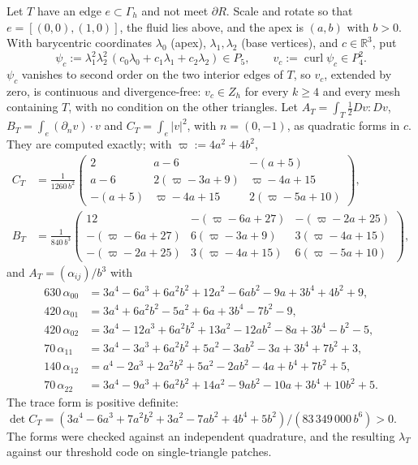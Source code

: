 \documentclass[pdflatex,sn-mathphys-num]{sn-jnl}
\theoremstyle{thmstyleone}
\theoremstyle{thmstylethree}
\newcommand{\R}{\mathbb R}
\newcommand{\Gh}{\Gamma_h}
\newcommand{\Zh}{Z_h}
\newcommand{\dn}{\partial_n}
\newcommand{\curl}{\operatorname{curl}}
\begin{document}
Let $T$ have an edge $e\subset\Gh$ and not meet $\partial R$. Scale and rotate so that $e=[(0,0),(1,0)]$, the fluid lies above, and the apex is $(a,b)$ with $b>0$. With barycentric coordinates $\lambda_0$ (apex), $\lambda_1,\lambda_2$ (base vertices), and $c\in\R^3$, put
\[
\psi_c:=\lambda_1^2\lambda_2^2\,(c_0\lambda_0+c_1\lambda_1+c_2\lambda_2)\in P_5,\qquad v_c:=\curl\psi_c\in P_4^2 .
\]
$\psi_c$ vanishes to second order on the two interior edges of $T$, so $v_c$, extended by zero, is continuous and divergence-free: $v_c\in\Zh$ for every $k\ge4$ and every mesh containing $T$, with no condition on the other triangles. Let $A_T=\int_T\frac12Dv:Dv$, $B_T=\int_e(\dn v)\cdot v$ and $C_T=\int_e|v|^2$, with $n=(0,-1)$, as quadratic forms in $c$. They are computed exactly; with $\varpi:=4a^2+4b^2$,
\begin{align*}
C_T&=\frac1{1260\,b^2}\begin{pmatrix}2&a-6&-(a+5)\\ a-6&2(\varpi-3a+9)&\varpi-4a+15\\ -(a+5)&\varpi-4a+15&2(\varpi-5a+10)\end{pmatrix},\\
B_T&=\frac1{840\,b^3}\begin{pmatrix}12&-(\varpi-6a+27)&-(\varpi-2a+25)\\ -(\varpi-6a+27)&6(\varpi-3a+9)&3(\varpi-4a+15)\\ -(\varpi-2a+25)&3(\varpi-4a+15)&6(\varpi-5a+10)\end{pmatrix},
\end{align*}
and $A_T=(\alpha_{ij})/b^3$ with
\begin{align*}
630\,\alpha_{00}&=3a^4-6a^3+6a^2b^2+12a^2-6ab^2-9a+3b^4+4b^2+9,\\
420\,\alpha_{01}&=3a^4+6a^2b^2-5a^2+6a+3b^4-7b^2-9,\\
420\,\alpha_{02}&=3a^4-12a^3+6a^2b^2+13a^2-12ab^2-8a+3b^4-b^2-5,\\
70\,\alpha_{11}&=3a^4-3a^3+6a^2b^2+5a^2-3ab^2-3a+3b^4+7b^2+3,\\
140\,\alpha_{12}&=a^4-2a^3+2a^2b^2+5a^2-2ab^2-4a+b^4+7b^2+5,\\
70\,\alpha_{22}&=3a^4-9a^3+6a^2b^2+14a^2-9ab^2-10a+3b^4+10b^2+5 .
\end{align*}
The trace form is positive definite: $\det C_T=(3a^4-6a^3+7a^2b^2+3a^2-7ab^2+4b^4+5b^2)/(83\,349\,000\,b^6)>0$. The forms were checked against an independent quadrature, and the resulting $\lambda_T$ against our threshold code on single-triangle patches.
\end{document}
